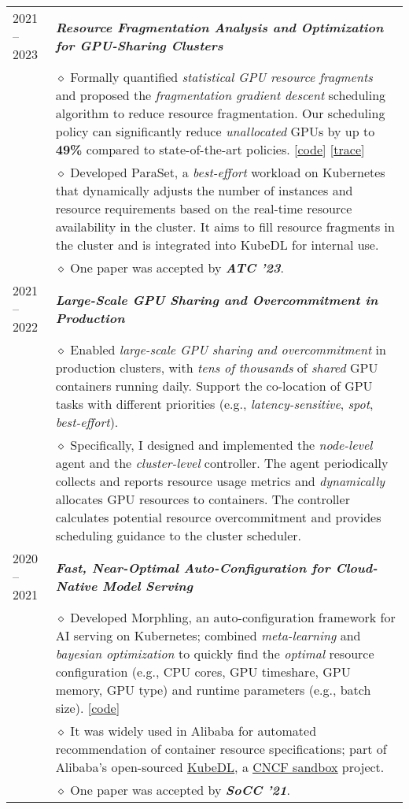 \documentclass[letterpaper, 12pt]{article}
\begin{document}
\begin{longtable}{p{1.0in}p{5.8in}}
2021 -- 2023
& \textbf{\emph{Resource Fragmentation Analysis and Optimization for GPU-Sharing Clusters}} \\
    & $\diamond$ Formally quantified \textit{statistical GPU resource fragments} and proposed the \textit{fragmentation gradient descent} scheduling algorithm to reduce resource fragmentation. Our scheduling policy can significantly reduce \textit{unallocated} GPUs by up to \textbf{49\%} compared to state-of-the-art policies. [\href{https://github.com/hkust-adsl/kubernetes-scheduler-simulator}{\underline{code}}] [\href{https://github.com/alibaba/clusterdata/tree/master/cluster-trace-gpu-v2023}{\underline{trace}}] \\
    & $\diamond$ Developed ParaSet, a \textit{best-effort} workload on Kubernetes that dynamically adjusts the number of instances and resource requirements based on the real-time resource availability in the cluster. It aims to fill resource fragments in the cluster and is integrated into KubeDL for internal use. \\
    & $\diamond$ One paper was accepted by \textbf{\emph{ATC '23}}. \\

2021 -- 2022
& \textbf{\emph{Large-Scale GPU Sharing and Overcommitment in Production}} \\
    & $\diamond$ Enabled \textit{large-scale GPU sharing and overcommitment} in production clusters, with \textit{tens of thousands }of \textit{shared} GPU containers running daily. Support the co-location of GPU tasks with different priorities (e.g., \textit{latency-sensitive}, \textit{spot}, \textit{best-effort}). \\
    & $\diamond$ Specifically, I designed and implemented the \textit{node-level} agent and the \textit{cluster-level} controller. The agent periodically collects and reports resource usage metrics and \textit{dynamically} allocates GPU resources to containers. The controller calculates potential resource overcommitment and provides scheduling guidance to the cluster scheduler. \\

2020 -- 2021
& \textbf{\emph{Fast, Near-Optimal Auto-Configuration for Cloud-Native Model Serving}} \\
    & $\diamond$ Developed Morphling, an auto-configuration framework for AI serving on Kubernetes; combined \textit{meta-learning} and \textit{bayesian optimization} to quickly find the \textit{optimal} resource configuration (e.g., CPU cores, GPU timeshare, GPU memory, GPU type) and runtime parameters (e.g., batch size). [\href{https://github.com/kubedl-io/morphling}{\underline{code}}] \\
    & $\diamond$ It was widely used in Alibaba for automated recommendation of container resource specifications; part of Alibaba's open-sourced \href{https://github.com/kubedl-io/kubedl}{\underline{KubeDL}}, a \href{https://landscape.cncf.io/?item=provisioning--automation-configuration--kubedl}{\underline{CNCF sandbox}} project. \\
    & $\diamond$ One paper was accepted by \textbf{\emph{SoCC '21}}. \\


\end{longtable}
\end{document}
